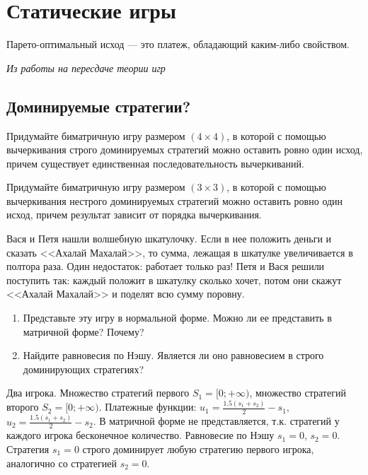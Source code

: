 \section{Статические игры} %

Парето-оптимальный исход --- это платеж, обладающий каким-либо свойством.

{\it Из работы на пересдаче теории игр}

\subsection{Доминируемые стратегии?}

\begin{problem}[Конструктор]
Придумайте биматричную игру размером  $\left(4\times 4\right)$, в которой с помощью вычеркивания строго доминируемых стратегий можно оставить ровно один исход, причем существует единственная последовательность вычеркиваний.
\begin{sol}
\end{sol}
\end{problem}

\begin{problem}[Конструктор]
Придумайте биматричную игру размером  $\left(3\times 3\right)$, в которой с помощью вычеркивания нестрого доминируемых стратегий можно оставить ровно один исход, причем результат зависит от порядка вычеркивания.\par
\begin{sol}
\end{sol}
\end{problem}

\begin{problem}
Вася и Петя нашли волшебную шкатулочку. Если в нее положить деньги и сказать <<Ахалай Махалай>>, то сумма, лежащая в шкатулке увеличивается в полтора раза. Один недостаток: работает только раз! Петя и Вася решили поступить так: каждый положит в шкатулку сколько хочет, потом они скажут <<Ахалай Махалай>> и поделят всю сумму поровну.\par
\begin{enumerate}
\item 	Представьте эту игру в нормальной форме. Можно ли ее представить в матричной форме? Почему?\par
\item 	Найдите равновесия по Нэшу. Является ли оно равновесием в строго доминирующих стратегиях?
\end{enumerate}



\begin{sol}
Два игрока. Множество стратегий первого $S_{1}=[0;+\infty)$, множество стратегий второго $S_{2}=[0;+\infty)$. Платежные функции: $u_{1}=\frac{1.5(s_{1}+s_{2})}{2}-s_{1}$,  $u_{2}=\frac{1.5(s_{1}+s_{2})}{2}-s_{2}$. В матричной форме не представляется, т.к. стратегий у каждого игрока бесконечное количество. Равновесие по Нэшу $s_{1}=0$, $s_{2}=0$. Стратегия $s_{1}=0$ строго доминирует любую стратегию первого игрока, аналогично со стратегией $s_{2}=0$.
\end{sol}
\end{problem}

